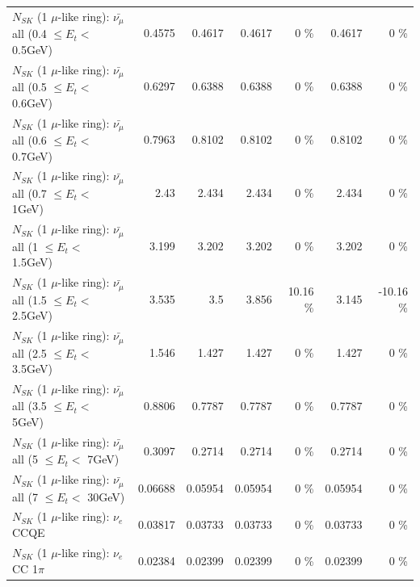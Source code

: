 \begin{table}
\begin{tabular}{| l | r | r | r  r | r  r |}
 $N_{SK}$ (1 $\mu$-like ring): $\bar{\nu_{\mu}}$ all (0.4 $\leq E_{t} <$ 0.5GeV) &          0.4575 &          0.4617 &          0.4617 &        0 \%  &          0.4617 &        0 \%  \\ 
 $N_{SK}$ (1 $\mu$-like ring): $\bar{\nu_{\mu}}$ all (0.5 $\leq E_{t} <$ 0.6GeV) &          0.6297 &          0.6388 &          0.6388 &        0 \%  &          0.6388 &        0 \%  \\ 
 $N_{SK}$ (1 $\mu$-like ring): $\bar{\nu_{\mu}}$ all (0.6 $\leq E_{t} <$ 0.7GeV) &          0.7963 &          0.8102 &          0.8102 &        0 \%  &          0.8102 &        0 \%  \\ 
   $N_{SK}$ (1 $\mu$-like ring): $\bar{\nu_{\mu}}$ all (0.7 $\leq E_{t} <$ 1GeV) &            2.43 &           2.434 &           2.434 &        0 \%  &           2.434 &        0 \%  \\ 
   $N_{SK}$ (1 $\mu$-like ring): $\bar{\nu_{\mu}}$ all (1 $\leq E_{t} <$ 1.5GeV) &           3.199 &           3.202 &           3.202 &        0 \%  &           3.202 &        0 \%  \\ 
 $N_{SK}$ (1 $\mu$-like ring): $\bar{\nu_{\mu}}$ all (1.5 $\leq E_{t} <$ 2.5GeV) &           3.535 &             3.5 &           3.856 &    10.16 \%  &           3.145 &   -10.16 \%  \\ 
 $N_{SK}$ (1 $\mu$-like ring): $\bar{\nu_{\mu}}$ all (2.5 $\leq E_{t} <$ 3.5GeV) &           1.546 &           1.427 &           1.427 &        0 \%  &           1.427 &        0 \%  \\ 
   $N_{SK}$ (1 $\mu$-like ring): $\bar{\nu_{\mu}}$ all (3.5 $\leq E_{t} <$ 5GeV) &          0.8806 &          0.7787 &          0.7787 &        0 \%  &          0.7787 &        0 \%  \\ 
     $N_{SK}$ (1 $\mu$-like ring): $\bar{\nu_{\mu}}$ all (5 $\leq E_{t} <$ 7GeV) &          0.3097 &          0.2714 &          0.2714 &        0 \%  &          0.2714 &        0 \%  \\ 
    $N_{SK}$ (1 $\mu$-like ring): $\bar{\nu_{\mu}}$ all (7 $\leq E_{t} <$ 30GeV) &         0.06688 &         0.05954 &         0.05954 &        0 \%  &         0.05954 &        0 \%  \\ 
\hline
\hline
\hline
                                      $N_{SK}$ (1 $\mu$-like ring): $\nu_e$ CCQE &         0.03817 &         0.03733 &         0.03733 &        0 \%  &         0.03733 &        0 \%  \\ 
                                 $N_{SK}$ (1 $\mu$-like ring): $\nu_e$ CC 1$\pi$ &         0.02384 &         0.02399 &         0.02399 &        0 \%  &         0.02399 &        0 \%  \\ 

\end{tabular}
\end{table}
